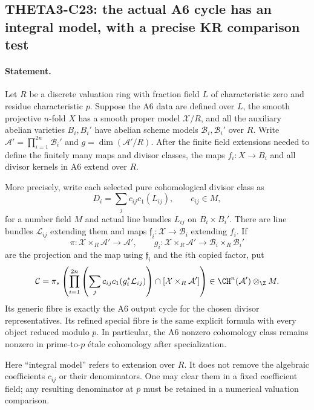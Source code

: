 \subsection{THETA3-C23: the actual A6 cycle has an integral model, with a precise KR comparison test}\label{C23}

\paragraph{Statement.}
Let $R$ be a discrete valuation ring with fraction field $L$
of characteristic zero and residue characteristic $p$.
Suppose the A6 data are defined over $L$, the smooth projective
$n$-fold $X$ has a smooth proper model $\mathcal X/R$, and
all the auxiliary abelian varieties $B_i,B_i'$ have abelian
scheme models $\mathcal B_i,\mathcal B_i'$ over $R$.
Write $\mathcal A'=\prod_{i=1}^{2n}\mathcal B_i'$ and
$g=\dim(\mathcal A'/R)$.
After the finite field extensions needed to define the finitely
many maps and divisor classes, the maps $f_i:X\to B_i$ and
all divisor kernels in A6 extend over $R$.

More precisely, write each selected pure cohomological divisor class as
\[
 D_i=\sum_j c_{ij}c_1(L_{ij}),\qquad c_{ij}\in M,
\]
for a number field $M$ and actual line bundles $L_{ij}$ on
$B_i\times B_i'$.
There are line bundles $\mathcal L_{ij}$ extending them and
maps $\mathfrak f_i:\mathcal X\to\mathcal B_i$ extending
$f_i$.  If
\[
 \pi:\mathcal X\times_R\mathcal A'\longrightarrow\mathcal A',
 \qquad
 g_i:\mathcal X\times_R\mathcal A'\longrightarrow
                   \mathcal B_i\times_R\mathcal B_i'
\]
are the projection and the map using $\mathfrak f_i$ and
the $i$th copied factor, put
\begin{equation}\label{C23-integral-cycle}
 \mathcal C=
  \pi_*\left(
    \prod_{i=1}^{2n}
        \left(\sum_jc_{ij}c_1(g_i^*\mathcal L_{ij})\right)
        \cap[\mathcal X\times_R\mathcal A']\right)
       \in\CH^n(\mathcal A')\otimes_\Z M.
\end{equation}
Its generic fibre is exactly the A6 output cycle for the chosen
divisor representatives.  Its refined special fibre is the same
explicit formula with every object reduced modulo $p$.
In particular, the A6 nonzero cohomology class remains nonzero
in prime-to-$p$ \'etale cohomology after specialization.

Here ``integral model'' refers to extension over $R$.
It does not remove the algebraic coefficients $c_{ij}$ or their
denominators.  One may clear them in a fixed coefficient field;
any resulting denominator at $p$ must be retained in a numerical
valuation comparison.

